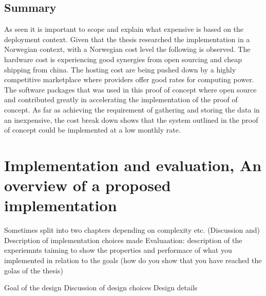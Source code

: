 \documentclass[]{uiophd}
\begin{document}
\section{Summary}
As seen it is important to scope and explain what expensive is based on the deployment context. Given that the thesis researched the implementation in a Norwegian context, with a Norwegian cost level the following is observed. The hardware cost is experiencing good synergies from open sourcing and cheap shipping from china. The hosting cost are being pushed down by a highly competitive marketplace where providers offer good rates for computing power. The software packages that was used in this proof of concept where open source and contributed greatly in accelerating the implementation of the proof of concept. As far as achieving the requirement of gathering and storing the data in an inexpensive, the cost break down shows that the system outlined in the proof of concept could be implemented at a low monthly rate.


\chapter{Implementation and evaluation, An overview of a proposed implementation}

Sometimes split into two chapters depending on complexity etc.
(Discussion and) Description of implementation choices made 
Evaluaation: description of the experiemnts taiming to show the properties 
and performace of what you implemented in relation to the goals (how do you show that you have reached the golas of the thesis)

Goal of the design
Discussion of design choices
Design details
\end{document}
